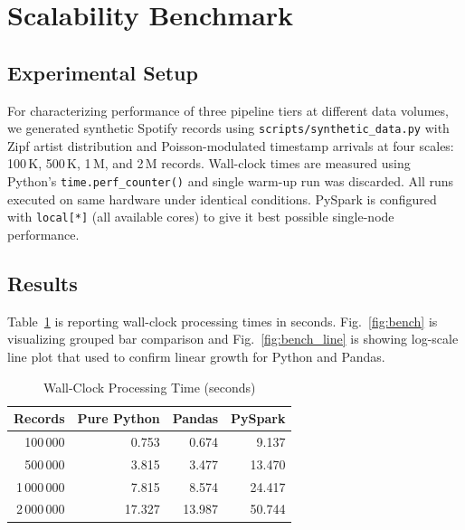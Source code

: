 \documentclass[conference]{IEEEtran}
\newcommand{\tabletight}{\footnotesize\setlength{\tabcolsep}{3.5pt}\renewcommand{\arraystretch}{1.08}}
\begin{document}
\section{Scalability Benchmark}
\label{sec:benchmark}

\subsection{Experimental Setup}

For characterizing performance of three pipeline tiers at different data volumes, we generated synthetic Spotify records using \texttt{scripts/synthetic\_data.py} with Zipf artist distribution and Poisson-modulated timestamp arrivals at four scales: 100\,K, 500\,K, 1\,M, and 2\,M records. Wall-clock times are measured using Python's \texttt{time.perf\_counter()} and single warm-up run was discarded. All runs executed on same hardware under identical conditions. PySpark is configured with \texttt{local[*]} (all available cores) to give it best possible single-node performance.

\subsection{Results}

Table~\ref{tab:bench} is reporting wall-clock processing times in seconds. Fig.~\ref{fig:bench} is visualizing grouped bar comparison and Fig.~\ref{fig:bench_line} is showing log-scale line plot that used to confirm linear growth for Python and Pandas.

\begin{table}[!t]
\caption{Wall-Clock Processing Time (seconds)}
\label{tab:bench}
\centering
\tabletight
\begin{tabular}{rrrr}
\toprule
\textbf{Records} & \textbf{Pure Python} & \textbf{Pandas} & \textbf{PySpark} \\
\midrule
100\,000    & 0.753  & 0.674  & 9.137  \\
500\,000    & 3.815  & 3.477  & 13.470 \\
1\,000\,000 & 7.815  & 8.574  & 24.417 \\
2\,000\,000 & 17.327 & 13.987 & 50.744 \\
\bottomrule
\end{tabular}
\end{table}
\end{document}
